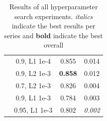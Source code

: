 {{\begin{table}[t]
\begin{tabular}{c|c|cc}
              & 0.9, L1 1e-4             &               0.855 &             0.014 \\
              & 0.9, L2 1e-3             &      \textbf{0.858} &             0.012 \\
              & 0.7, L2 1e-3             &               0.826 &             0.004 \\
              & 0.9, L1 1e-3             &               0.784 &             0.003 \\
              & 0.95, L1 1e-3            &               0.802 &    \textit{0.002} \\
    \bottomrule
    \end{tabular}
    \caption{Results of all hyperparameter search experiments. \emph{italics} indicate the best results per series and \textbf{bold} indicate the best overall}
    \label{tab:hp_search}
\end{table}
}
}

